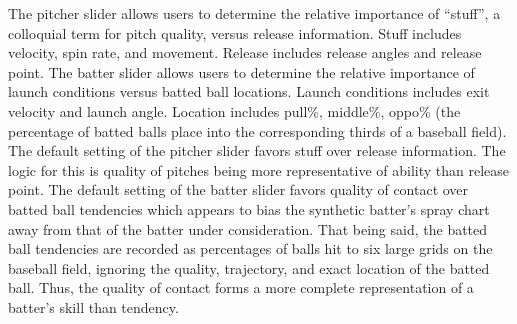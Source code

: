 \documentclass[12pt]{article}
\begin{document}




The pitcher slider allows users to determine the relative importance of ``stuff'', a colloquial term for pitch quality, versus release information. Stuff includes velocity, spin rate, and movement. Release includes release angles and release point. The batter slider allows users to determine the relative importance of launch conditions versus batted ball locations. Launch conditions includes exit velocity and launch angle. Location includes pull\%, middle\%, oppo\% (the percentage of batted balls place into the corresponding thirds of a baseball field). The default setting of the pitcher slider favors stuff over release information. The logic for this is quality of pitches being more representative of ability than release point. The default setting of the batter slider favors quality of contact over batted ball tendencies which appears to bias the synthetic batter's spray chart away from that of the batter under consideration. That being said, the batted ball tendencies are recorded as percentages of balls hit to six large grids on the baseball field, ignoring the quality, trajectory, and exact location of the batted ball. Thus, the quality of contact forms a more complete representation of a batter's skill than tendency.
\end{document}
